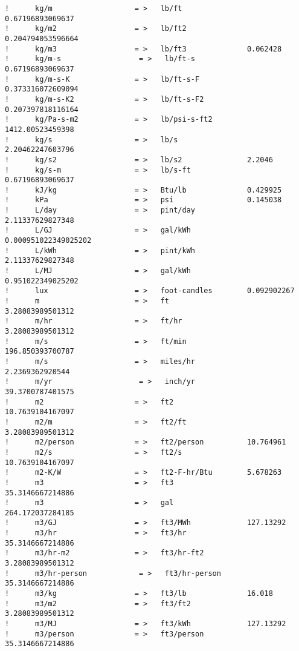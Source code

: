 \begin{lstlisting}
!      kg/m                   = >   lb/ft               0.67196893069637
!      kg/m2                  = >   lb/ft2              0.204794053596664
!      kg/m3                  = >   lb/ft3              0.062428
!      kg/m-s                  = >   lb/ft-s             0.67196893069637
!      kg/m-s-K               = >   lb/ft-s-F           0.373316072609094
!      kg/m-s-K2              = >   lb/ft-s-F2          0.207397818116164
!      kg/Pa-s-m2             = >   lb/psi-s-ft2        1412.00523459398
!      kg/s                   = >   lb/s                2.20462247603796
!      kg/s2                  = >   lb/s2               2.2046
!      kg/s-m                 = >   lb/s-ft             0.67196893069637
!      kJ/kg                  = >   Btu/lb              0.429925
!      kPa                    = >   psi                 0.145038
!      L/day                  = >   pint/day            2.11337629827348
!      L/GJ                   = >   gal/kWh             0.000951022349025202
!      L/kWh                  = >   pint/kWh            2.11337629827348
!      L/MJ                   = >   gal/kWh             0.951022349025202
!      lux                    = >   foot-candles        0.092902267
!      m                      = >   ft                  3.28083989501312
!      m/hr                   = >   ft/hr               3.28083989501312
!      m/s                    = >   ft/min              196.850393700787
!      m/s                    = >   miles/hr            2.2369362920544
!      m/yr                    = >   inch/yr             39.3700787401575
!      m2                     = >   ft2                 10.7639104167097
!      m2/m                   = >   ft2/ft              3.28083989501312
!      m2/person              = >   ft2/person          10.764961
!      m2/s                   = >   ft2/s               10.7639104167097
!      m2-K/W                 = >   ft2-F-hr/Btu        5.678263
!      m3                     = >   ft3                 35.3146667214886
!      m3                     = >   gal                 264.172037284185
!      m3/GJ                  = >   ft3/MWh             127.13292
!      m3/hr                  = >   ft3/hr              35.3146667214886
!      m3/hr-m2               = >   ft3/hr-ft2          3.28083989501312
!      m3/hr-person            = >   ft3/hr-person       35.3146667214886
!      m3/kg                  = >   ft3/lb              16.018
!      m3/m2                  = >   ft3/ft2             3.28083989501312
!      m3/MJ                  = >   ft3/kWh             127.13292
!      m3/person              = >   ft3/person          35.3146667214886

\end{lstlisting}
